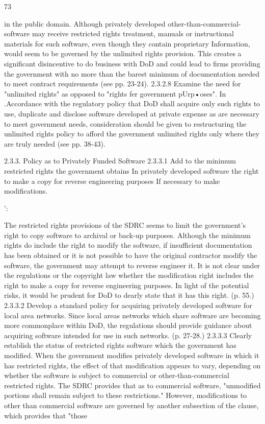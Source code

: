 \documentclass[12pt]{article}
\begin{document}
73

in the public domain.
Although privately developed other-than-commercial-software may receive restricted rights treatment,
manuals or instructional materials for such software, even though they contain proprietary Information, would seem to be governed by the unlimited rights provision. This creates a significant disincentive to do business with DoD and could lead to firms providing the government with no more than the
barest minimum of documentation needed to meet contract requirements (see pp. 23-24).
2.3.2.8 Examine the need for "unlimited rights" as opposed to "rights fer government
pUrp•oses".
In .Accordance with the regulatory policy that DoD shall acquire only such rights to use, duplicate and
disclose software developed at private expense as are necessary to meet government needs, consideration should be given to restructuring the unlimited rights policy to afford the government unlimited rights only where they are truly needed (see pp. 38-43).

2.3.3. Policy as to Privately Funded Software
2.3.3.1 Add to the minimum restricted rights the government obtains In privately developed
software the right to make a copy for reverse engineering purposes If necessary to make
modifications.

':

The restricted rights provisions of the SDRC seems to limit the government's right to copy software to
archival or back-up purposes. Although the minimum rights do include the right to modify the software, if insufficient documentation has been obtained or it is not possible to have the original contractor modify the software, the government may attempt to reverse engineer it. It is not clear under the
regulations or the copyright law whether the modification right includes the right to make a copy for
reverse engineering purposes. In light of the potential risks, it would be prudent for DoD to dearly
state that it has this right. (p. 55.)
2.3.3.2 Develop a standard policy for acquiring privately developed software for local area
networks.
Since local areas networks which share software are becoming more commonplace within DoD, the
regulations should provide guidance about acquiring software intended for use in such networks. (p.
27-28.)
2.3.3.3 Clearly establish the status of restricted rights software which the government has
modified.
When the government modifies privately developed software in which it has restricted rights, the
effect of that modification appears to vary, depending on whether the software is subject to commercial or other-than-commercial restricted rights. The SDRC provides that as to commercial software,
"unmodified portions shall remain subject to these restrictions." However, modifications to other than
commercial software are governed by another subsection of the clause, which provides that "those
\end{document}
